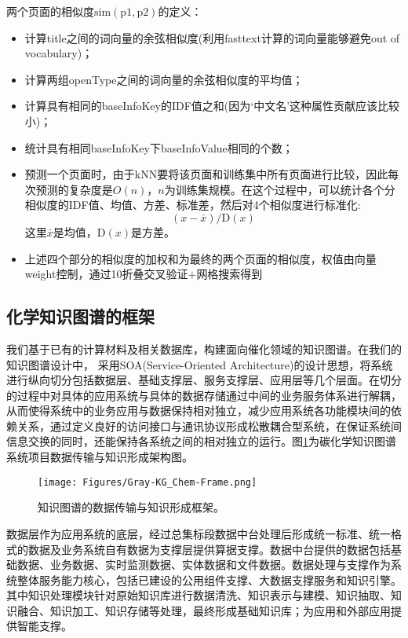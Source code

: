 两个页面的相似度$\mathrm{sim(p1,p2)}$的定义：
\begin{itemize}
	\item 计算\textrm{title}之间的词向量的余弦相似度(利用\textrm{fasttext}计算的词向量能够避免out of vocabulary)；
	\item 计算两组\textrm{openType}之间的词向量的余弦相似度的平均值；
	\item 计算具有相同的\textrm{baseInfoKey}的\textrm{IDF}值之和(因为‘中文名’这种属性贡献应该比较小)；
	\item 统计具有相同\textrm{baseInfoKey}下\textrm{baseInfoValue}相同的个数；
	\item 预测一个页面时，由于\textrm{kNN}要将该页面和训练集中所有页面进行比较，因此每次预测的复杂度是$O(n)$，$n$为训练集规模。在这个过程中，可以统计各个分相似度的\textrm{IDF}值、均值、方差、标准差，然后对4个相似度进行标准化:
		\begin{displaymath}
			(x-\bar{x})/\mathrm{D}(x)
		\end{displaymath}
		这里$\bar{x}$是均值，$\mathrm{D}(x)$是方差。
	\item 上述四个部分的相似度的加权和为最终的两个页面的相似度，权值由向量\textrm{weight}控制，通过10折叠交叉验证$+$网格搜索得到
\end{itemize}

\subsection{化学知识图谱的框架}
我们基于已有的计算材料及相关数据库，构建面向催化领域的知识图谱。在我们的知识图谱设计中，%
采用\textrm{SOA(Service-Oriented Architecture)}的设计思想，将系统进行纵向切分包括数据层、基础支撑层、服务支撑层、应用层等几个层面。在切分的过程中对具体的应用系统与具体的数据存储通过中间的业务服务体系进行解耦，从而使得系统中的业务应用与数据保持相对独立，减少应用系统各功能模块间的依赖关系，通过定义良好的访问接口与通讯协议形成松散耦合型系统，在保证系统间信息交换的同时，还能保持各系统之间的相对独立的运行。图\ref{KG_Chem-Frame}为碳化学知识图谱系统项目数据传输与知识形成架构图。
\begin{figure}[h!]
\centering
\texttt{[image: Figures/Gray-KG\_Chem-Frame.png]}
\caption{知识图谱的数据传输与知识形成框架。}%
\label{KG_Chem-Frame}
\end{figure} 
数据层作为应用系统的底层，经过总集标段数据中台处理后形成统一标准、统一格式的数据及业务系统自有数据为支撑层提供算据支撑。数据中台提供的数据包括基础数据、业务数据、实时监测数据、实体数据和文件数据。数据处理与支撑作为系统整体服务能力核心，包括已建设的公用组件支撑、大数据支撑服务和知识引擎。其中知识处理模块针对原始知识库进行数据清洗、知识表示与建模、知识抽取、知识融合、知识加工、知识存储等处理，最终形成基础知识库；为应用和外部应用提供智能支撑。

